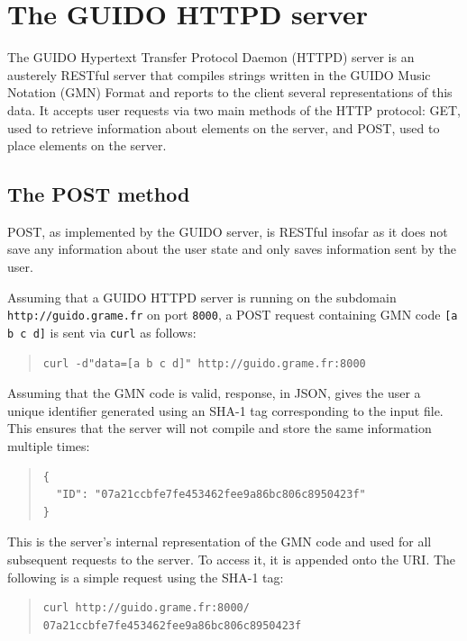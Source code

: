 \documentclass{article}
\newcommand{\verburl}[1]{
\begin{quote}
\begingroup
\fontsize{7.5pt}{12pt}\selectfont
#1
\endgroup
\end{quote}
}
\newcommand{\guidosize}{6pt}
\begin{document}
\section{The GUIDO HTTPD server}
The GUIDO Hypertext Transfer Protocol Daemon (HTTPD) server is an austerely RESTful server that compiles strings written in the GUIDO Music Notation (GMN) Format and reports to the client several representations of this data.  It accepts user requests via two main methods of the HTTP protocol: GET, used to retrieve information about elements on the server, and POST, used to place elements on the server.
\subsection{The POST method}
POST, as implemented by the GUIDO server, is RESTful insofar as it does not save any information about the user state and only saves information sent by the user.\par
Assuming that a GUIDO HTTPD server is running on the subdomain \break \verb=http://guido.grame.fr= on port \verb=8000=, a POST request containing GMN code \verb=[a b c d]= is sent via \verb=curl= as follows:
\begin{quote}
\begingroup
\fontsize{\guidosize}{12pt}\selectfont
\begin{verbatim}
curl -d"data=[a b c d]" http://guido.grame.fr:8000
\end{verbatim}
\endgroup
\end{quote}
Assuming that the GMN code is valid, response, in JSON, gives the user a unique identifier generated using an SHA-1 tag corresponding to the input file.  This ensures that the server will not compile and store the same information multiple times:
\begin{quote}
\begingroup
\fontsize{\guidosize}{12pt}\selectfont
\begin{verbatim}
{
  "ID": "07a21ccbfe7fe453462fee9a86bc806c8950423f"
}
\end{verbatim}
\endgroup
\end{quote}
This is the server's internal representation of the GMN code and used for all subsequent requests to the server.  To access it, it is appended onto the URI.  The following is a simple request using the SHA-1 tag:
\begin{quote}
\begingroup
\fontsize{\guidosize}{12pt}\selectfont
\begin{verbatim}
curl http://guido.grame.fr:8000/
07a21ccbfe7fe453462fee9a86bc806c8950423f
\end{verbatim}
\endgroup
\end{quote}
\end{document}
